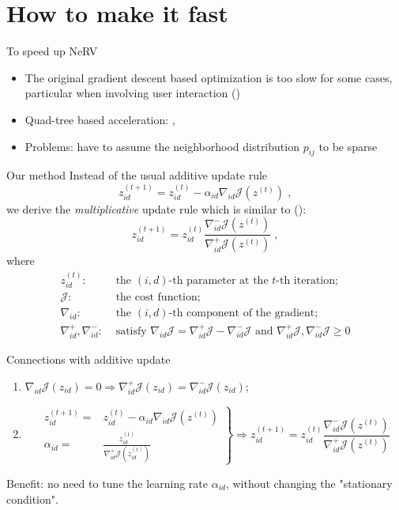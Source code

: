 \documentclass[first=dgreen,second=purple,logo=yellowexc]{aaltoslides}
\begin{document}
\section{How to make it fast}
\begin{frame}{To speed up NeRV}
\begin{itemize}
\item The original gradient descent based optimization is too slow for some cases, particular when involving user interaction (\cite{peltonen13eurovis})
\item Quad-tree based acceleration: \cite{yang13icml}, \cite{vandermaaten13iclr}
\item Problems: have to assume the neighborhood distribution $p_{ij}$ to be sparse
\end{itemize}
\end{frame}

\begin{frame}{Our method}
Instead of the usual additive update rule
\[
z^{(t+1)}_{id}=z^{(t)}_{id}-\alpha_{id} \nabla_{id} \mathcal{J}(z^{(t)})\;,
\]
we derive the \emph{multiplicative} update rule which is similar to (\cite{yang10mlsp}):
\[
z^{(t+1)}_{id}=z^{(t)}_{id}\frac{\nabla^-_{id} \mathcal{J}(z^{(t)})}{\nabla^+_{id} \mathcal{J}(z^{(t)})}\;,
\]
where
\begin{align*}
z^{(t)}_{id}:&\mbox{ the $(i,d)$-th parameter at the $t$-th iteration;}\\
\mathcal{J}:&\mbox{ the cost function;}\\
\nabla_{id}:&\mbox{ the $(i,d)$-th component of the gradient;}\\
\nabla_{id}^+,\nabla_{id}^-:&\mbox{ satisfy }\nabla_{id}\mathcal{J}=\nabla_{id}^+\mathcal{J}-\nabla_{id}^-\mathcal{J}\mbox{ and }\nabla_{id}^+\mathcal{J},\nabla_{id}^-\mathcal{J}\ge 0
\end{align*}
\end{frame}

\begin{frame}{Connections with additive update}
\begin{enumerate}
\item $\nabla_{id}\mathcal{J}(z_{id})=0 \Longrightarrow \nabla_{id}^+\mathcal{J}(z_{id})=\nabla_{id}^-\mathcal{J}(z_{id})$;
\item
\[
\left.
\begin{aligned}
z^{(t+1)}_{id} =& z^{(t)}_{id}-\alpha_{id} \nabla_{id} \mathcal{J}(z^{(t)})\\
\alpha_{id} =& \frac{z_{id}^{(t)}}{\nabla_{id}^+\mathcal{J}(z_{id}^{(t)})}
\end{aligned}
\right\}\Longrightarrow z^{(t+1)}_{id}=z^{(t)}_{id}\frac{\nabla^-_{id} \mathcal{J}(z^{(t)})}{\nabla^+_{id} \mathcal{J}(z^{(t)})}
\]
\end{enumerate}
Benefit: no need to tune the learning rate $\alpha_{id}$, without changing the "stationary condition".
\end{frame}
\end{document}

